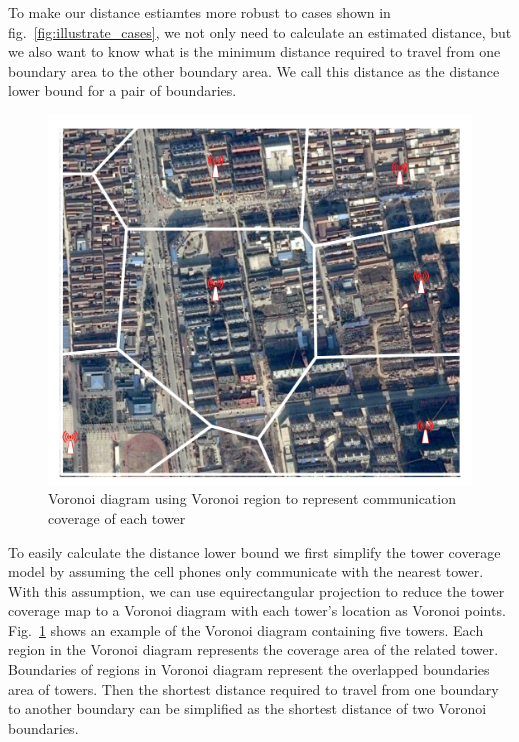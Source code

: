 To make our distance estiamtes more robust to cases shown in fig.~\ref{fig:illustrate_cases}, we not only need to calculate an estimated distance, but we also want to know what is the minimum distance required to travel from one boundary area to the other boundary area. We call this distance as the distance lower bound for a pair of boundaries.

\begin{figure}[h]
    \centering
    \includegraphics[width=\linewidth]{./figures/voronoi_illustrate.pdf}
    \caption{Voronoi diagram using Voronoi region to represent communication coverage of each tower}
		\label{fig:voronoi}
\end{figure}

To easily calculate the distance lower bound we first simplify the tower coverage model by assuming the cell phones only communicate with the nearest tower. With this assumption, we can use equirectangular projection to reduce the tower coverage map to a Voronoi diagram with each tower's location as Voronoi points. Fig.~\ref{fig:voronoi} shows an example of the Voronoi diagram containing five towers. Each region in the Voronoi diagram represents the coverage area of the related tower. Boundaries of regions in Voronoi diagram represent the overlapped boundaries area of towers. Then the shortest distance required to travel from one boundary to another boundary can be simplified as the shortest distance of two Voronoi boundaries. 

